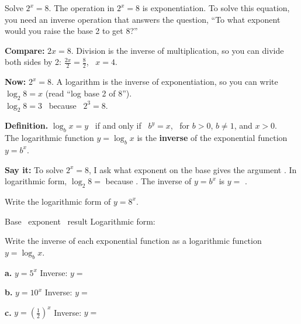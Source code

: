 Solve $2^x=8$. The operation in $2^x=8$ is exponentiation. To solve this equation, you need an inverse operation that answers the question, ``To what exponent would you raise the base 2 to get 8?''

\begin{minipage}[t]{0.48\textwidth}
\textbf{Compare:} $2x=8$. Division is the inverse of multiplication, so you can divide both sides by 2:
$\frac{2x}{2}=\frac82$, \ $x=4$.
\end{minipage}\hfill
\begin{minipage}[t]{0.48\textwidth}
\textbf{Now:} $2^x=8$. A logarithm is the inverse of exponentiation, so you can write
$\log_2 8=x$ (read ``log base 2 of 8''). \\
$\log_2 8=3$ \ because \ $2^3=8$.
\end{minipage}

\vspace{4pt}
\textbf{Definition.} $\log_b x=y$ \ if and only if \ $b^y=x$, \ for $b>0$, $b\neq1$, and $x>0$.\\
The logarithmic function $y=\log_b x$ is the \textbf{inverse} of the exponential function $y=b^x$.

\textbf{Say it:} To solve $2^x=8$, I ask what exponent on the base \blank[1.2cm] gives the argument \blank[1.2cm]. In logarithmic form, $\log_2 8=$ \blank[1.2cm] because \blank[2cm]. The inverse of $y=b^x$ is $y=$ \blank[2.4cm].

Write the logarithmic form of $y=8^x$.

Base \blank[1cm] \ exponent \blank[1cm] \ result \blank[1cm] \qquad Logarithmic form: \blank[4cm]
\lines[1]

\newpage

Write the inverse of each exponential function as a logarithmic function $y=\log_b x$.

\begin{minipage}[t]{0.31\textwidth}
\textbf{a.} $y=5^x$
\lines[2]
Inverse: $y=$ \blank[2cm]
\end{minipage}\hfill
\begin{minipage}[t]{0.31\textwidth}
\textbf{b.} $y=10^x$
\lines[2]
Inverse: $y=$ \blank[2cm]
\end{minipage}\hfill
\begin{minipage}[t]{0.31\textwidth}
\textbf{c.} $y=\left(\tfrac12\right)^x$
\lines[2]
Inverse: $y=$ \blank[2cm]
\end{minipage}

